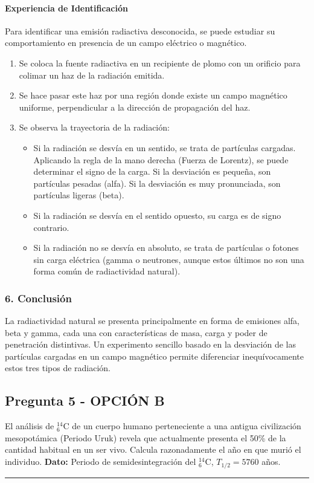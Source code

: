 \paragraph*{Experiencia de Identificación}
Para identificar una emisión radiactiva desconocida, se puede estudiar su comportamiento en presencia de un campo eléctrico o magnético.
\begin{enumerate}
    \item Se coloca la fuente radiactiva en un recipiente de plomo con un orificio para colimar un haz de la radiación emitida.
    \item Se hace pasar este haz por una región donde existe un campo magnético uniforme, perpendicular a la dirección de propagación del haz.
    \item Se observa la trayectoria de la radiación:
        \begin{itemize}
            \item Si la radiación se desvía en un sentido, se trata de partículas cargadas. Aplicando la regla de la mano derecha (Fuerza de Lorentz), se puede determinar el signo de la carga. Si la desviación es pequeña, son partículas pesadas (alfa). Si la desviación es muy pronunciada, son partículas ligeras (beta).
            \item Si la radiación se desvía en el sentido opuesto, su carga es de signo contrario.
            \item Si la radiación no se desvía en absoluto, se trata de partículas o fotones sin carga eléctrica (gamma o neutrones, aunque estos últimos no son una forma común de radiactividad natural).
        \end{itemize}
\end{enumerate}

\subsubsection*{6. Conclusión}
\begin{cajaconclusion}
La radiactividad natural se presenta principalmente en forma de emisiones alfa, beta y gamma, cada una con características de masa, carga y poder de penetración distintivas. Un experimento sencillo basado en la desviación de las partículas cargadas en un campo magnético permite diferenciar inequívocamente estos tres tipos de radiación.
\end{cajaconclusion}

\newpage
\subsection{Pregunta 5 - OPCIÓN B}
\label{subsec:5B_2016_jul_ext}
\begin{cajaenunciado}
El análisis de ${}_6^{14}\text{C}$ de un cuerpo humano perteneciente a una antigua civilización mesopotámica (Periodo Uruk) revela que actualmente presenta el 50\% de la cantidad habitual en un ser vivo. Calcula razonadamente el año en que murió el individuo.
\textbf{Dato:} Periodo de semidesintegración del ${}_6^{14}\text{C}$, $T_{1/2}=5760$ años.
\end{cajaenunciado}
\hrule

